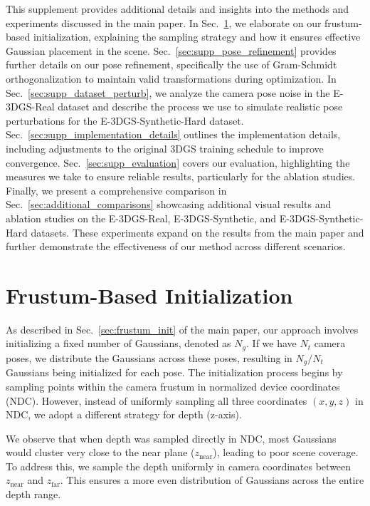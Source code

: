 \clearpage
\maketitlesupplementary
\setcounter{figure}{0}
\renewcommand{\thefigure}{\Roman{figure}}
\setcounter{section}{0}
\renewcommand{\thesection}{\Roman{section}}
\vspace{15pt}

This supplement provides additional details and insights into the methods and experiments discussed in the main paper.
In Sec.~\ref{sec:supp_frustum}, we elaborate on our frustum-based initialization, explaining the sampling strategy and how it ensures effective Gaussian placement in the scene.
Sec.~\ref{sec:supp_pose_refinement} provides further details on our pose refinement, specifically the use of Gram-Schmidt orthogonalization to maintain valid transformations during optimization. 
In Sec.~\ref{sec:supp_dataset_perturb}, we analyze the camera pose noise in the E-3DGS-Real dataset and describe the process we use to simulate realistic pose perturbations for the E-3DGS-Synthetic-Hard dataset.
Sec.~\ref{sec:supp_implementation_details} outlines the implementation details, including adjustments to the original 3DGS training schedule to improve convergence.
Sec.~\ref{sec:supp_evaluation} covers our evaluation, highlighting the measures we take to ensure reliable results, particularly for the ablation studies. 
Finally, we present a comprehensive comparison in Sec.~\ref{sec:additional_comparisons}  showcasing additional visual results and ablation studies on the E-3DGS-Real, E-3DGS-Synthetic, and E-3DGS-Synthetic-Hard datasets. 
These experiments expand on the results from the main paper and further demonstrate the effectiveness of our method across different scenarios. 

\section{Frustum-Based Initialization}
\label{sec:supp_frustum}

As described in Sec.~\ref{sec:frustum_init} of the main paper, our approach involves initializing a fixed number of Gaussians, denoted as $N_g$. If we have $N_t$ camera poses, we distribute the Gaussians across these poses, resulting in $N_g / N_t$ Gaussians being initialized for each pose.
The initialization process begins by sampling points within the camera frustum in normalized device coordinates (NDC). However, instead of uniformly sampling all three coordinates $(x, y, z)$ in NDC, we adopt a different strategy for depth (z-axis).

We observe that when depth was sampled directly in NDC, most Gaussians would cluster very close to the near plane ($z_\text{near}$), leading to poor scene coverage. To address this, we sample the depth uniformly in camera coordinates between $z_\mathrm{near}$ and $z_\mathrm{far}$. This ensures a more even distribution of Gaussians across the entire depth range.

